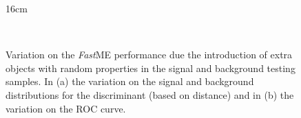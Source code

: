\begin{figure}[htbp]{16cm}
\caption{Variation on the \textit{Fast}ME performance due the introduction of extra objects with random properties in the signal and background testing samples. In (a) the variation on the signal and background distributions for the discriminant (based on distance) and in (b) the variation on the ROC curve.}
\\
\label{fig:fme_particle_filter}
\end{figure}


